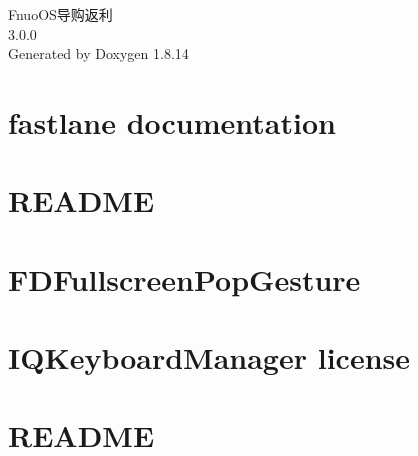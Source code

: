 \documentclass[twoside]{book}
\newcommand{\+}{\discretionary{\mbox{\scriptsize$\hookleftarrow$}}{}{}}
\newcommand{\clearemptydoublepage}{%
  \newpage{\pagestyle{empty}\cleardoublepage}%
}
\begin{document}
\hypersetup{pageanchor=false,
             bookmarksnumbered=true,
             pdfencoding=unicode
            }
\begin{titlepage}
\vspace*{7cm}
\begin{center}%
{\Large Fnuo\+O\+S导购返利 \\[1ex]\large 3.\+0.\+0 }\\
\vspace*{1cm}
{\large Generated by Doxygen 1.8.14}\\
\end{center}
\end{titlepage}
\clearemptydoublepage
{}
\tableofcontents
\clearemptydoublepage
{}
\hypersetup{pageanchor=true}

\chapter{fastlane documentation}
\label{md_fastlane__r_e_a_d_m_e}

\chapter{R\+E\+A\+D\+ME}
\label{md__pods__a_f_networking__r_e_a_d_m_e}

\chapter{F\+D\+Fullscreen\+Pop\+Gesture}
\label{md__pods__f_d_fullscreen_pop_gesture__r_e_a_d_m_e}

\chapter{I\+Q\+Keyboard\+Manager license}
\label{md__pods__i_q_keyboard_manager__l_i_c_e_n_s_e}

\chapter{R\+E\+A\+D\+ME}
\label{md__pods__i_q_keyboard_manager__r_e_a_d_m_e}

\end{document}
